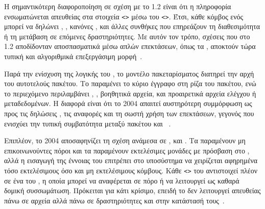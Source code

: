 \begin{table}[htbp]
\centering
\caption{Στοιχεία  του  2004 }
\label{tab:cam_2004_elements}

\end{table}

Η σημαντικότερη διαφοροποίηση σε σχέση με το  1.2 είναι ότι η πληροφορία  ενσωματώνεται απευθείας στα στοιχεία \texttt{<>} μέσω του \texttt{<>}. Έτσι, κάθε κόμβος ενός  μπορεί να δηλώνει , , κανόνες ,  και άλλες συνθήκες που επηρεάζουν τη διαθεσιμότητα ή τη μετάβαση σε επόμενες δραστηριότητες. Με αυτόν τον τρόπο, σχέσεις που στο  1.2 αποδίδονταν αποσπασματικά μέσω απλών επεκτάσεων, όπως τα , αποκτούν τώρα τυπική και αλγοριθμικά επεξεργάσιμη μορφή~\cite{IMS_SimpleSequencing, ADL_SCORM2004_SN}.

Παρά την ενίσχυση της λογικής του , το μοντέλο πακεταρίσματος διατηρεί την αρχή του αυτοτελούς  πακέτου. Το \texttt{} παραμένει το κύριο έγγραφο στη ρίζα του πακέτου, ενώ το περιεχόμενο περιλαμβάνει , , βοηθητικά αρχεία,  και προαιρετικά αρχεία ελέγχου ή μεταδεδομένων. Η διαφορά είναι ότι το  2004 απαιτεί αυστηρότερη συμμόρφωση ως προς τις δηλώσεις , τις αναφορές  και τη σωστή χρήση των  επεκτάσεων, γεγονός που ενισχύει την τυπική συμβατότητα μεταξύ πακέτου και ~\cite{IMS_CP_Specification, ADL_SCORM2004_CAM}.

Επιπλέον, το  2004 αποσαφηνίζει τη σχέση ανάμεσα σε ,  και . Τα  παραμένουν μη επικοινωνούντες πόροι και τα  παραμένουν εκτελέσιμες μονάδες με πρόσβαση στο , αλλά η εισαγωγή της έννοιας του  επιτρέπει στο  υποσύστημα να χειρίζεται αφηρημένα τόσο εκτελέσιμους όσο και μη εκτελέσιμους κόμβους. Κάθε \texttt{<>} του  αντιστοιχεί πλέον σε ένα  του , η οποία μπορεί να αναφέρεται σε πόρο ή να λειτουργεί ως καθαρά δομική συσσωμάτωση. Πρόκειται για κάτι κρίσιμο, επειδή το  δεν λειτουργεί απευθείας πάνω σε αρχεία αλλά πάνω σε δραστηριότητες και στην κατάστασή τους~\cite{ADL_SCORM2004_SN, IMS_SS_BehaviorModel}.

